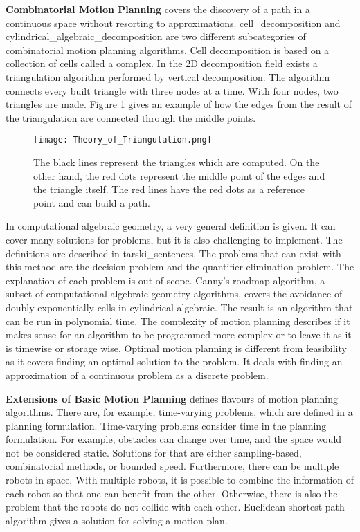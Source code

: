 \textbf{Combinatorial Motion Planning} covers the discovery of a path in a continuous space without resorting to approximations. \Gls{cell_decomposition} and \Gls{cylindrical_algebraic_decomposition} are two different subcategories of combinatorial motion planning algorithms. Cell decomposition is based on a collection of cells called a complex. In the 2D decomposition field exists a \Gls{triangulation} algorithm performed by vertical decomposition. The algorithm connects every built triangle with three nodes at a time. With four nodes, two triangles are made. Figure \ref{fig:Theory of Triangulation} gives an example of how the edges from the result of the \Gls{triangulation} are connected through the middle points.
\begin{figure}[H]
    \centering
    \texttt{[image: Theory\_of\_Triangulation.png]}
    \caption{The black lines represent the triangles which are computed. On the other hand, the red dots represent the middle point of the edges and the triangle itself. The red lines have the red dots as a reference point and can build a path. \cite{planning_algorithms_steven_m_lavalle}}
    \label{fig:Theory of Triangulation}
\end{figure}
In computational algebraic geometry, a very general definition is given. It can cover many solutions for problems, but it is also challenging to implement. The definitions are described in \Gls{tarski_sentences}. The problems that can exist with this method are the decision problem and the quantifier-elimination problem. The explanation of each problem is out of scope. Canny's roadmap algorithm, a subset of computational algebraic geometry algorithms, covers the avoidance of doubly exponentially cells in cylindrical algebraic. \cite{constructing_roadmaps_of_semi-algebraic_sets_I} The result is an algorithm that can be run in polynomial time. The complexity of motion planning describes if it makes sense for an algorithm to be programmed more complex or to leave it as it is timewise or storage wise. Optimal motion planning is different from feasibility as it covers finding an optimal solution to the problem. It deals with finding an approximation of a continuous problem as a discrete problem. \cite{planning_algorithms_steven_m_lavalle}

\textbf{Extensions of Basic Motion Planning} defines flavours of motion planning algorithms. There are, for example, time-varying problems, which are defined in a planning formulation. Time-varying problems consider time in the planning formulation. For example, obstacles can change over time, and the space would not be considered static. Solutions for that are either sampling-based, combinatorial methods, or bounded speed. Furthermore, there can be multiple robots in space. With multiple robots, it is possible to combine the information of each robot so that one can benefit from the other. Otherwise, there is also the problem that the robots do not collide with each other. \cite{planning_algorithms_steven_m_lavalle} Euclidean shortest path algorithm gives a solution for solving a motion plan. \cite{efficient_computation_of_euclidean_shortest_paths_in_the_plane}

